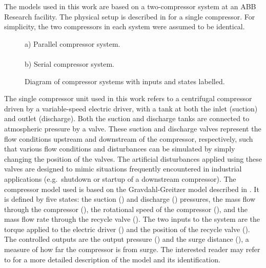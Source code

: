 \label{sec:modelling}
The models used in this work are based on a two-compressor system at an ABB Research facility.
The physical setup is described in \cite{Cortinovis2015} for a single compressor.
For simplicity, the two compressors in each system were assumed to be identical.

\begin{figure}
    
    {\centering a) Parallel compressor system.\\}
    \\
    {\centering b) Serial compressor system.\\}
  \caption[Diagram of compressor systems.]{Diagram of compressor systems with inputs and states labelled.}
  \label{fig:comp-systems-diagrams}
\end{figure}


The single compressor unit used in this work refers to a centrifugal compressor driven by a variable-speed electric driver, with a tank at both the inlet (suction) and outlet (discharge).
Both the suction and discharge tanks are connected to atmospheric pressure by a valve.
These suction and discharge valves represent the flow conditions upstream and downstream of the compressor, respectively, such that various flow conditions and disturbances can be simulated by simply changing the position of the valves.
The artificial disturbances applied using these valves are designed to mimic situations frequently encountered in industrial applications (e.g.\ shutdown or startup of a downstream compressor).
The compressor model used is based on the Gravdahl-Greitzer model described in \cite{Gravdahl1999}. 
It is defined by five states: the suction () and discharge () pressures, the mass flow through the compressor (), the rotational speed of the compressor (), and the mass flow rate through the recycle valve ().
The two inputs to the system are the torque applied to the electric driver () and the position of the recycle valve ().
The controlled outputs are the output pressure () and the surge distance (), a measure of how far the compressor is from surge.
The interested reader may refer to \cite{Cortinovis2015} for a more detailed description of the model and its identification.

